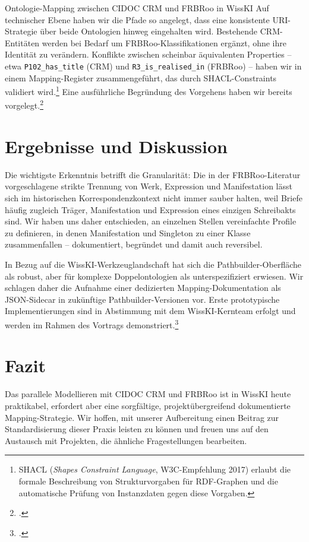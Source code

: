 \begin{beitrag}{Ontologie-Mapping zwischen CIDOC CRM und FRBRoo in WissKI}
Auf technischer Ebene haben wir die Pfade so angelegt, dass eine konsistente URI-Strategie über beide Ontologien hinweg eingehalten wird. Bestehende CRM-Entitäten werden bei Bedarf um FRBRoo-Klassifikationen ergänzt, ohne ihre Identität zu verändern. Konflikte zwischen scheinbar äquivalenten Properties -- etwa \texttt{P102\_has\_title} (CRM) und \texttt{R3\_is\_realised\_in} (FRBRoo) -- haben wir in einem Mapping-Register zusammengeführt, das durch SHACL-Constraints validiert wird.\footnote{SHACL (\emph{Shapes Constraint Language}, W3C-Empfehlung 2017) erlaubt die formale Beschreibung von Strukturvorgaben für RDF-Graphen und die automatische Prüfung von Instanzdaten gegen diese Vorgaben.} Eine ausführliche Begründung des Vorgehens haben wir bereits vorgelegt.\footcite[51--53]{albrecht2024-mapping}

\section{Ergebnisse und Diskussion}
Die wichtigste Erkenntnis betrifft die Granularität: Die in der FRBRoo-Literatur vorgeschlagene strikte Trennung von Werk, Expression und Manifestation lässt sich im historischen Korrespondenzkontext nicht immer sauber halten, weil Briefe häufig zugleich Träger, Manifestation und Expression eines einzigen Schreibakts sind. Wir haben uns daher entschieden, an einzelnen Stellen vereinfachte Profile zu definieren, in denen Manifestation und Singleton zu einer Klasse zusammenfallen -- dokumentiert, begründet und damit auch reversibel.

In Bezug auf die WissKI-Werkzeuglandschaft hat sich die Pathbuilder-Oberfläche als robust, aber für komplexe Doppelontologien als unterspezifiziert erwiesen. Wir schlagen daher die Aufnahme einer dedizierten Mapping-Dokumentation als JSON-Sidecar in zukünftige Pathbuilder-Versionen vor. Erste prototypische Implementierungen sind in Abstimmung mit dem WissKI-Kernteam erfolgt und werden im Rahmen des Vortrags demonstriert.\footcite[vgl. auch][92]{braun2025-pathbuilder}

\section{Fazit}
Das parallele Modellieren mit CIDOC CRM und FRBRoo ist in WissKI heute praktikabel, erfordert aber eine sorgfältige, projektübergreifend dokumentierte Mapping-Strategie. Wir hoffen, mit unserer Aufbereitung einen Beitrag zur Standardisierung dieser Praxis leisten zu können und freuen uns auf den Austausch mit Projekten, die ähnliche Fragestellungen bearbeiten.

\end{beitrag}

